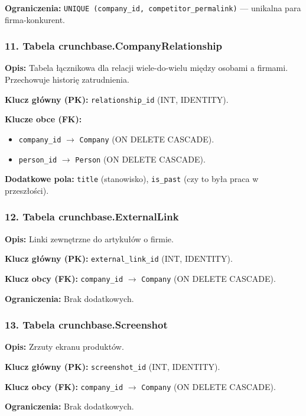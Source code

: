 \documentclass[12pt,a4paper]{article}
\begin{document}
\textbf{Ograniczenia:} \texttt{UNIQUE (company\_id, competitor\_permalink)} --- unikalna para firma-konkurent.

\subsubsection{11. Tabela crunchbase.CompanyRelationship}

\textbf{Opis:} Tabela łącznikowa dla relacji wiele-do-wielu między osobami a firmami. Przechowuje historię zatrudnienia.

\textbf{Klucz główny (PK):} \texttt{relationship\_id} (INT, IDENTITY).

\textbf{Klucze obce (FK):}
\begin{itemize}[noitemsep]
    \item \texttt{company\_id} $\rightarrow$ \texttt{Company} (ON DELETE CASCADE).
    \item \texttt{person\_id} $\rightarrow$ \texttt{Person} (ON DELETE CASCADE).
\end{itemize}

\textbf{Dodatkowe pola:} \texttt{title} (stanowisko), \texttt{is\_past} (czy to była praca w przeszłości).

\subsubsection{12. Tabela crunchbase.ExternalLink}

\textbf{Opis:} Linki zewnętrzne do artykułów o firmie.

\textbf{Klucz główny (PK):} \texttt{external\_link\_id} (INT, IDENTITY).

\textbf{Klucz obcy (FK):} \texttt{company\_id} $\rightarrow$ \texttt{Company} (ON DELETE CASCADE).

\textbf{Ograniczenia:} Brak dodatkowych.

\subsubsection{13. Tabela crunchbase.Screenshot}

\textbf{Opis:} Zrzuty ekranu produktów.

\textbf{Klucz główny (PK):} \texttt{screenshot\_id} (INT, IDENTITY).

\textbf{Klucz obcy (FK):} \texttt{company\_id} $\rightarrow$ \texttt{Company} (ON DELETE CASCADE).

\textbf{Ograniczenia:} Brak dodatkowych.
\end{document}
